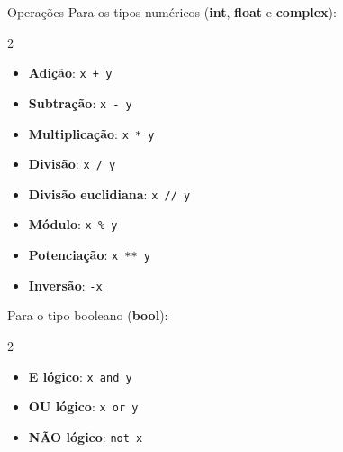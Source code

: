 \begin{frame}{Operações}
	Para os tipos numéricos 
	(\textbf{int}, \textbf{float} e \textbf{complex}):
	
	\begin{multicols}{2}
		\begin{itemize}
			\item \textbf{Adição}: 
				\texttt{x + y} 
				
			\item \textbf{Subtração}: 
				\texttt{x - y}
				
			\item \textbf{Multiplicação}: 
				\texttt{x * y}	
				
			\item \textbf{Divisão}: 
				\texttt{x / y}	
				
			\item \textbf{Divisão euclidiana}: 
				\texttt{x // y}	
				
			\item \textbf{Módulo}: 
				\texttt{x \% y}	
				
			\item \textbf{Potenciação}: 
				\texttt{x ** y}	
				
			\item \textbf{Inversão}: 
				\texttt{-x}	
		\end{itemize}	
	\end{multicols}	
	
	\vfill
	
	Para o tipo booleano (\textbf{bool}):	
	
	\begin{multicols}{2}
		\begin{itemize}
			\item \textbf{E lógico}: 
				\texttt{x and y} 
			
			\item \textbf{OU lógico}: 
				\texttt{x or y}
			
			\item \textbf{NÃO lógico}: 
				\texttt{not x}								
		\end{itemize}	
	\end{multicols}
	
  \end{frame}	

